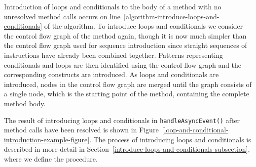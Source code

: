 Introduction of loops and conditionals to the body of a method with no
unresolved method calls occurs on
line~\ref{algorithm-introduce-loops-and-conditionals} of the
algorithm.
To introduce loops and conditionals we consider the control flow graph
of the method again, though it is now much simpler than the control
flow graph used for sequence introduction since straight sequences of
instructions have already been combined together.
Patterns representing conditionals and loops are then identified using
the control flow graph and the corresponding constructs are
introduced.
As loops and conditionals are introduced, nodes in the control flow
graph are merged until the graph consists of a single node, which is
the starting point of the method, containing the complete method body.

The result of introducing loops and conditionals in
\texttt{handleAsyncEvent()} after method calls have been resolved is
shown in
Figure~\ref{loop-and-conditional-introduction-example-figure}.
The process of introducing loops and conditionals is described in more
detail in Section~\ref{introduce-loops-and-conditionals-subsection},
where we define the  procedure.
